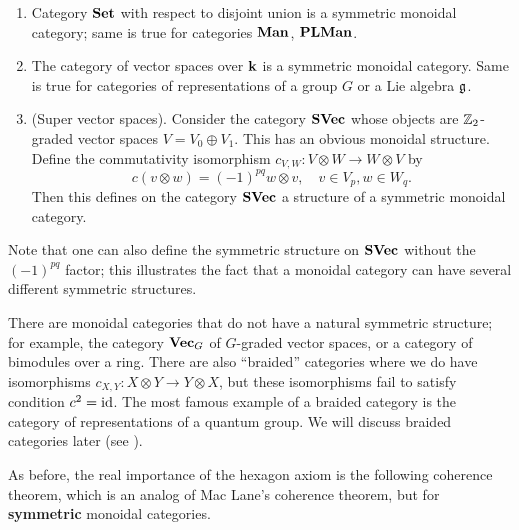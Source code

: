 \begin{example}\par\noindent
  \begin{enumerate}
    \item Category $\mathbf{Set}$ with respect to disjoint union is a
      symmetric monoidal category; same is true for categories
      $\mathbf{Man}$, $\mathbf{PLMan}$.
    \item
      The category of vector spaces over $\mathbf{k}$ is a symmetric monoidal category.
      Same is true for categories of representations of a group $G$ or
      a Lie algebra $\mathfrak{g}$.
    \item (Super vector spaces). Consider the category $\mathbf{SVec}$ whose
      objects are $\mathbb{Z}_2$-graded vector spaces $V=V_0\oplus V_1$. This
      has an obvious monoidal structure.
      Define the commutativity isomorphism $c_{V,W}\colon V\otimes W
      \to W\otimes V$ by
      $$
      c(v\otimes w)=(-1)^{pq} w\otimes v, \quad v\in V_p, w\in W_q.
      $$
      Then this defines on the category $\mathbf{SVec}$ a structure of a
      symmetric monoidal category.
  \end{enumerate}
\end{example}
Note that one can also define the symmetric structure on $\mathbf{SVec}$ without the
$(-1)^{pq}$ factor; this illustrates the fact that a monoidal category can have
several different symmetric structures.
\begin{remark}
  There are monoidal categories that do not have a natural symmetric structure;
  for example, the category $\mathbf{Vec}_G$ of $G$-graded vector spaces, or a
  category
  of bimodules over a ring. There are also ``braided'' categories where we do
  have isomorphisms $c_{X,Y}\colon X\otimes Y \to Y\otimes X$, but these
  isomorphisms fail to satisfy condition $c^2=\operatorname{id}$. The  most famous example of
  a braided  category  is the category of representations of a quantum group. We
  will discuss braided categories later (see ).
\end{remark}

As before, the real importance of the hexagon axiom is the following coherence
theorem, which is an analog of Mac Lane's coherence theorem, but for
\textbf{symmetric} monoidal categories.

